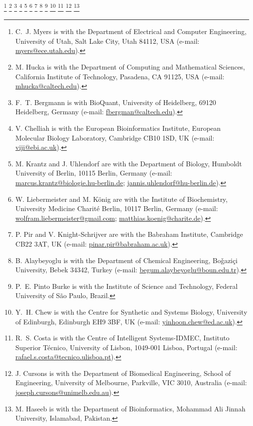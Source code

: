 \documentclass[journal,transmag]{IEEEtran}
\newcommand{\email}[1]{\href{mailto:#1}{#1}}
\begin{document}
{    \thanks{C.~J. Myers is with the Department of Electrical and Computer Engineering, University of Utah, Salt Lake City, Utah 84112, USA (e-mail: \email{myers@ece.utah.edu}).}
    \thanks{M. Hucka is with the Department of Computing and Mathematical Sciences, California Institute of Technology, Pasadena, CA 91125, USA (e-mail: \email{mhucka@caltech.edu}).}
    \thanks{F.~T. Bergmann is with BioQuant, University of Heidelberg, 69120 Heidelberg, Germany (e-mail: \email{fbergman@caltech.edu}).} 
    \thanks{V. Chelliah is with the European Bioinformatics Institute, European Molecular Biology Laboratory, Cambridge CB10 1SD, UK (e-mail: \email{viji@ebi.ac.uk}).}  
    \thanks{M. Krantz and J. Uhlendorf are with the Department of Biology, Humboldt University of Berlin, 10115 Berlin, Germany (e-mail: \email{marcus.krantz@biologie.hu-berlin.de}; \email{jannis.uhlendorf@hu-berlin.de}).}
    \thanks{W. Liebermeister and M. K\"{o}nig are with the Institute of Biochemistry, University Medicine Charit\'{e} Berlin, 10117 Berlin, Germany (e-mail: \email{wolfram.liebermeister@gmail.com}; \email{matthias.koenig@charite.de}).}
    \thanks{P. Pir and V. Knight-Schrijver are with the Babraham Institute, Cambridge CB22 3AT, UK (e-mail: \email{pinar.pir@babraham.ac.uk}).}
    \thanks{B. Alaybeyoglu is with the Department of Chemical Engineering, Bo\v{g}azi\c{c}i University, Bebek 34342, Turkey (e-mail: \email{begum.alaybeyoglu@boun.edu.tr}).}
    \thanks{P.~E. Pinto Burke is with the Institute of Science and Technology, Federal University of São Paulo, Brazil.}
    \thanks{Y.~H. Chew is with the Centre for Synthetic and Systems Biology, University of Edinburgh, Edinburgh EH9 3BF, UK (e-mail: \email{yinhoon.chew@ed.ac.uk}).}
    \thanks{R.~S. Costa is with the Centre of Intelligent Systems-IDMEC, Instituto Superior Técnico, University of Lisbon, 1049-001 Lisboa, Portugal (e-mail: \email{rafael.s.costa@tecnico.ulisboa.pt}).}
    \thanks{J. Cursons is with the Department of Biomedical Engineering, School of Engineering, University of Melbourne, Parkville, VIC 3010, Australia (e-mail: \email{joseph.cursons@unimelb.edu.au}).}
    \thanks{M. Haseeb is with the Department of Bioinformatics, Mohammad Ali Jinnah University, Islamabad, Pakistan.}
}
\end{document}

